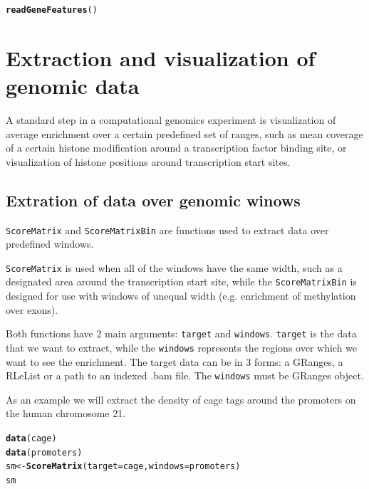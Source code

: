 \documentclass{article}\usepackage[]{graphicx}\usepackage[]{color}
\makeatletter
\newcommand{\hlstd}[1]{\textcolor[rgb]{0.345,0.345,0.345}{#1}}%
\newcommand{\hlkwb}[1]{\textcolor[rgb]{0.69,0.353,0.396}{#1}}%
\newcommand{\hlkwc}[1]{\textcolor[rgb]{0.333,0.667,0.333}{#1}}%
\newcommand{\hlkwd}[1]{\textcolor[rgb]{0.737,0.353,0.396}{\textbf{#1}}}%
\newenvironment{kframe}{%
 \def\at@end@of@kframe{}%
 \ifinner\ifhmode%
  \def\at@end@of@kframe{\end{minipage}}%
  \begin{minipage}{\columnwidth}%
 \fi\fi%
 \def\FrameCommand##1{\hskip\@totalleftmargin \hskip-\fboxsep
 \colorbox{shadecolor}{##1}\hskip-\fboxsep
     \hskip-\linewidth \hskip-\@totalleftmargin \hskip\columnwidth}%
 \MakeFramed {\advance\hsize-\width
   \@totalleftmargin\z@ \linewidth\hsize
   \@setminipage}}%
 {\par\unskip\endMakeFramed%
 \at@end@of@kframe}
\newenvironment{knitrout}{}{} %
\newcommand{\Rcode}[1]{{\texttt{#1}}}
\makeatother
\begin{document}
\begin{knitrout}
\color{fgcolor}\begin{kframe}
\begin{alltt}
\hlkwd{readGeneFeatures}\hlstd{()}
\end{alltt}
\end{kframe}
\end{knitrout}



\section{Extraction and visualization of genomic data}

A standard step in a computational genomics experiment is visualization of 
average enrichment over a certain predefined set of ranges, such as mean coverage
of a certain histone modification around a transcription factor binding site,
or visualization of histone positions around transcription start sites.


\subsection{Extration of data over genomic winows}

\Rcode{ScoreMatrix} and \Rcode{ScoreMatrixBin} are functions used to extract 
data over predefined windows.

\Rcode{ScoreMatrix} is used when all of the windows
have the same width, such as a designated area around the transcription start
site, while the \Rcode{ScoreMatrixBin} is designed for use with windows of 
unequal width (e.g. enrichment of methylation over exons).

Both functions have 2 main arguments: \Rcode{target} and 
\Rcode{windows}. \Rcode{target} is the data that we want to extract, while the 
\Rcode{windows} represents the regions over which we want to see the enrichment.
The target data can be in 3 forms: a GRanges, a RLeList or a path to an indexed 
.bam file. The \Rcode{windows} must be GRanges object.

As an example we will extract the density of cage tags around the promoters on 
the human chromosome 21.
\begin{knitrout}
\color{fgcolor}\begin{kframe}
\begin{alltt}
\hlkwd{data}\hlstd{(cage)}
\hlkwd{data}\hlstd{(promoters)}
\hlstd{sm} \hlkwb{<-} \hlkwd{ScoreMatrix}\hlstd{(}\hlkwc{target} \hlstd{= cage,} \hlkwc{windows} \hlstd{= promoters)}
\hlstd{sm}
\end{alltt}


{\ttfamily\noindent\itshape\color{messagecolor}{\#\#\ \  scoreMatrix with dims: 1055 2001}}\end{kframe}
\end{knitrout}
\end{document}
